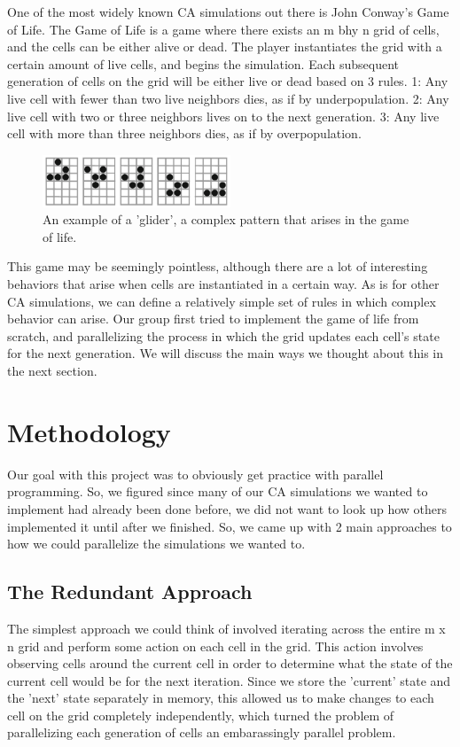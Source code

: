 \documentclass[12pt]{article}
\begin{document}
One of the most widely known CA simulations out there is John Conway's Game of Life. The Game of Life is a game where there exists an m bhy n grid of cells, and the cells can be either alive or dead. The player instantiates the grid with a certain amount of live cells, and begins the simulation. Each subsequent generation of cells on the grid will be either live or dead based on 3 rules. 1: Any live cell with fewer than two live neighbors dies, as if by underpopulation. 2: Any live cell with two or three neighbors lives on to the next generation. 3: Any live cell with more than three neighbors dies, as if by overpopulation.

\begin{figure}[!ht]
\centering
\includegraphics[width=0.5\textwidth]{glider.PNG}
\caption{\label{fig:chart_0}An example of a 'glider', a complex pattern that arises in the game of life.}
\end{figure}

This game may be seemingly pointless, although there are a lot of interesting behaviors that arise when cells are instantiated in a certain way. As is for other CA simulations, we can define a relatively simple set of rules in which complex behavior can arise. Our group first tried to implement the game of life from scratch, and parallelizing the process in which the grid updates each cell's state for the next generation. We will discuss the main ways we thought about this in the next section.

\section{Methodology}

Our goal with this project was to obviously get practice with parallel programming. So, we figured since many of our CA simulations we wanted to implement had already been done before, we did not want to look up how others implemented it until after we finished. So, we came up with 2 main approaches to how we could parallelize the simulations we wanted to.

\subsection{The Redundant Approach}
The simplest approach we could think of involved iterating across the entire m x n grid and perform some action on each cell in the grid. This action involves observing cells around the current cell in order to determine what the state of the current cell would be for the next iteration. Since we store the 'current' state and the 'next' state separately in memory, this allowed us to make changes to each cell on the grid completely independently, which turned the problem of parallelizing each generation of cells an embarassingly parallel problem.
\end{document}
